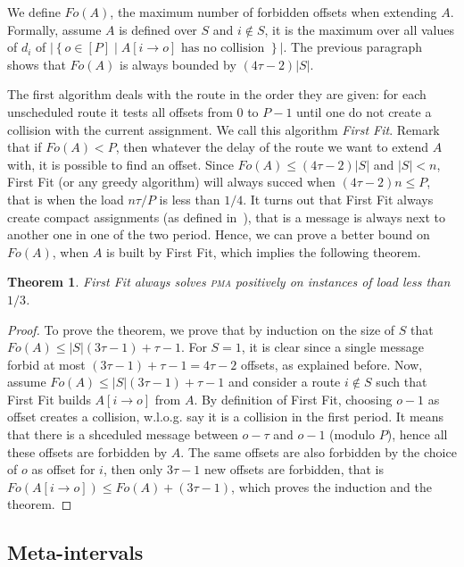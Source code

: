 \documentclass[10pt, conference, letterpaper]{IEEEtran}
\newtheorem{theorem}{Theorem}
\newcommand\pma{\textsc{pma}\xspace}
\begin{document}
We define $Fo(A)$, the maximum number of forbidden offsets when 
extending $A$. Formally, assume $A$ is defined over $S$ and $i\notin S$, 
it is the maximum over all values of $d_i$ of $|\left\{ o \in [P] \mid A[i \rightarrow o] \text{ has no collision }\right\}|$. The previous paragraph shows that $Fo(A)$ is always bounded by $(4 \tau -2)|S|$. 

The first algorithm deals with the route in the order they are given:  for each unscheduled route it tests all offsets from $0$ to $P-1$ until one do not create a collision with the current assignment.
We call this algorithm \emph{First Fit}. Remark that if $Fo(A) < P$, then whatever the delay of the route we want to extend $A$ with, it is possible to find an offset. Since $Fo(A) \leq (4 \tau -2)|S|$ and $|S| < n$, First Fit (or any greedy algorithm) will always succed when $(4 \tau -2)n \leq P$, that is when the load $ n\tau /P$ is less than $1/4$.
It turns out that First Fit always create compact assignments (as defined in~\cite{barth2018deterministic}), that is a message is always next to another one in one of the two period. Hence, we can prove a better bound on $Fo(A)$, when $A$ is built by First Fit, which implies the following theorem.


\begin{theorem}
First Fit always solves \pma positively on instances of load less than $1/3$. 
\end{theorem}
\begin{proof}
To prove the theorem, we prove that by induction on the size of $S$ that $Fo(A) \leq |S|(3\tau -1) + \tau -1$.  For $S = 1$, it is clear since a single message forbid at most $(3\tau -1) + \tau -1 = 4\tau-2$ offsets, as explained before. Now, assume $Fo(A) \leq |S|(3\tau -1) + \tau -1$ and consider a route $i \notin S$ such that First Fit builds $A[i \rightarrow o]$ from $A$. By definition of First Fit, choosing $o-1$ as offset creates a collision, w.l.o.g. 
say it is a collision in the first period. It means that there is a shceduled message between $o - \tau $ and $o-1$ (modulo $P$), hence all these offsets are forbidden by $A$.
The same offsets are also forbidden by the choice of $o$ as offset for $i$, then only $3\tau -1$ new offsets are forbidden, that is $Fo(A[i \rightarrow o]) \leq Fo(A) + (3\tau -1)$,
which proves the induction and the theorem.
\end{proof}


\subsection{Meta-intervals}
\end{document}

